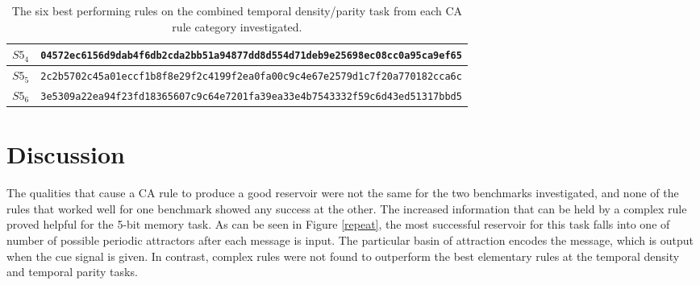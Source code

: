 \documentclass{elsarticle}
\begin{document}
\begin{multicols}{2}
\begin{table}[!htbp]
\begin{tabular}{|p{2cm}|l|}
\\ \hline
$S5_{4}$  &
\verb|04572ec6156d9dab4f6db2cda2bb51a94877dd8d554d71deb9e25698ec08cc0a95ca9ef65| 
\\ \hline
$S5_{5}$ &
\verb|2c2b5702c45a01eccf1b8f8e29f2c4199f2ea0fa00c9c4e67e2579d1c7f20a770182cca6c| 
\\ \hline
$S5_{6}$ &
\verb|3e5309a22ea94f23fd18365607c9c64e7201fa39ea33e4b7543332f59c6d43ed51317bbd5| 
\\ \hline

\end{tabular}
\caption{The six best performing rules on the combined temporal density/parity 
   task from each CA rule category investigated.}
\label{table:rules_temp_dens}
\end{table}


\section{Discussion}\label{discussion}
The qualities that cause a CA rule to produce a good reservoir were not the 
   same for the two benchmarks investigated, and none of the rules that worked 
   well for one benchmark showed any success at the other. The increased 
   information that can be held by a complex rule proved helpful for the 5-bit 
   memory task. As can be seen in Figure \ref{repeat}, the most successful 
   reservoir for this task falls into one of number of possible  periodic 
   attractors after each message is input. The particular basin of attraction 
   encodes the message, which is output when the cue signal is given. In 
   contrast, complex rules were not found to outperform the best elementary 
   rules at the temporal density and temporal parity tasks.
   

\end{multicols}
\end{document}
